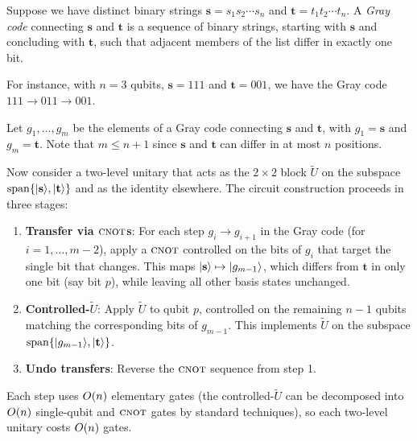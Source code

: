 \begin{definition}\label{def:gray-code}
  Suppose we have distinct binary strings
  $\mathbf{s} = s_1 s_2\cdots s_n$ and $\mathbf{t} = t_1 t_2\cdots t_n$.
  A \emph{Gray code} connecting $\mathbf{s}$ and $\mathbf{t}$ is a sequence
  of binary strings, starting with $\mathbf{s}$ and concluding with
  $\mathbf{t}$, such that adjacent members of the list differ in exactly one
  bit.
\end{definition}

For instance, with $n=3$ qubits, $\mathbf{s} = 111$ and
$\mathbf{t} = 001$, we have the Gray code $111 \to 011 \to 001$.

Let $g_1, \ldots, g_m$ be the elements of a Gray code connecting
$\mathbf{s}$ and $\mathbf{t}$, with $g_1 = \mathbf{s}$ and
$g_m = \mathbf{t}$.  Note that $m \le n+1$ since $\mathbf{s}$ and
$\mathbf{t}$ can differ in at most $n$ positions.

Now consider a two-level unitary that acts as the $2\times 2$ block
$\widetilde{U}$ on the subspace $\operatorname{span}\{|\mathbf{s}\rangle,|\mathbf{t}\rangle\}$
and as the identity elsewhere.  The circuit construction proceeds in three
stages:
\begin{enumerate}
  \item \textbf{Transfer via $\textsc{cnot}$s}: For each step $g_i\to g_{i+1}$ in
    the Gray code (for $i=1,\ldots,m-2$), apply a $\textsc{cnot}$ controlled on
    the bits of $g_i$ that target the single bit that changes.  This maps
    $|\mathbf{s}\rangle\mapsto |g_{m-1}\rangle$, which differs from
    $\mathbf{t}$ in only one bit (say bit $p$), while leaving all other
    basis states unchanged.
  \item \textbf{Controlled-$\widetilde{U}$}: Apply $\widetilde{U}$ to qubit
    $p$, controlled on the remaining $n-1$ qubits matching the
    corresponding bits of $g_{m-1}$.  This implements $\widetilde{U}$ on
    the subspace $\operatorname{span}\{|g_{m-1}\rangle,|\mathbf{t}\rangle\}$.
  \item \textbf{Undo transfers}: Reverse the $\textsc{cnot}$ sequence from step 1.
\end{enumerate}
Each step uses $O\!\left(n\right)$ elementary gates (the controlled-$\widetilde{U}$
can be decomposed into $O\!\left(n\right)$ single-qubit and $\textsc{cnot}$ gates by standard
techniques), so each two-level unitary costs $O\!\left(n\right)$ gates.

